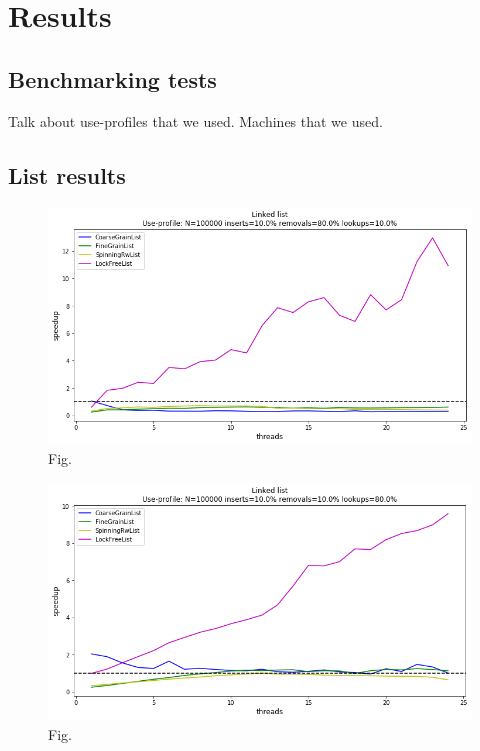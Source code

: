 \documentclass[11pt]{article}
\begin{document}
\section{Results}

\subsection{Benchmarking tests}
Talk about use-profiles that we used. Machines that we used.

\subsection{List results}


\begin{figure}[h]
\centering
\includegraphics[width=1.0\linewidth]{figs/lateday/combined/lateday_combined_list_insert_10_lookup_10_removal_80}
\caption{Fig.}
\label{fig:fig1}
\end{figure}

\begin{figure}[h]
\centering
\includegraphics[width=1.0\linewidth]{figs/lateday/combined/lateday_combined_list_insert_10_lookup_80_removal_10}
\caption{Fig.}
\label{fig:fig1}
\end{figure}
\end{document}
